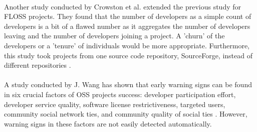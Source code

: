 \paragraph{}
Another study conducted by Crowston et al. extended the previous study for
FLOSS projects. They found that the number of developers as a simple count of
developers is a bit of a flawed number as it aggregates the number of
developers leaving and the number of developers joining a project. A 'churn' of
the developers or a 'tenure' of individuals would be more appropriate.
Furthermore, this study took projects from one source code repository,
SourceForge, instead of different repositories \cite{crowston2006}.

\paragraph{}
A study conducted by J. Wang has shown that early warning signs can be found in
six crucial factors of OSS projects success: developer participation effort, developer
service quality, software license restrictiveness, targeted users, community
social network ties, and community quality of social ties \cite{wang2012}.
However, warning signs in these factors are not easily detected automatically.

